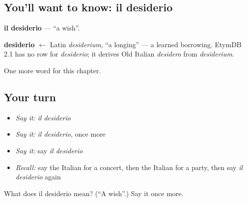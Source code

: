 \subsection*{You'll want to know: il desiderio}
\textbf{il desiderio} — \textquotedblleft{}a wish\textquotedblright{}.

\begin{cousinweb}
\textbf{desiderio} $\leftarrow$ Latin \emph{desiderium}, \textquotedblleft{}a longing\textquotedblright{} — a learned borrowing. EtymDB 2.1 has no row for \emph{desiderio}; it derives Old Italian \emph{desidero} from \emph{desiderium}.
\end{cousinweb}

\begin{grammarlens}[title={What you've built}]
One more word for this chapter.
\end{grammarlens}

\subsection*{Your turn}
\begin{itemize}
\raggedright
  \item \emph{Say it:} \emph{il desiderio}
  \item \emph{Say it:} \emph{il desiderio}, once more
  \item \emph{Say it:} say \emph{il desiderio}
  \item \emph{Recall:} say the Italian for a concert, then the Italian for a party, then say \emph{il desiderio} again
\end{itemize}

\begin{tcolorbox}[breakable,colback=teal!4,colframe=teal!35!black,title={Before you move on}]
What does il desiderio mean? (\textquotedblleft{}A wish\textquotedblright{}.) Say it once more.
\end{tcolorbox}
